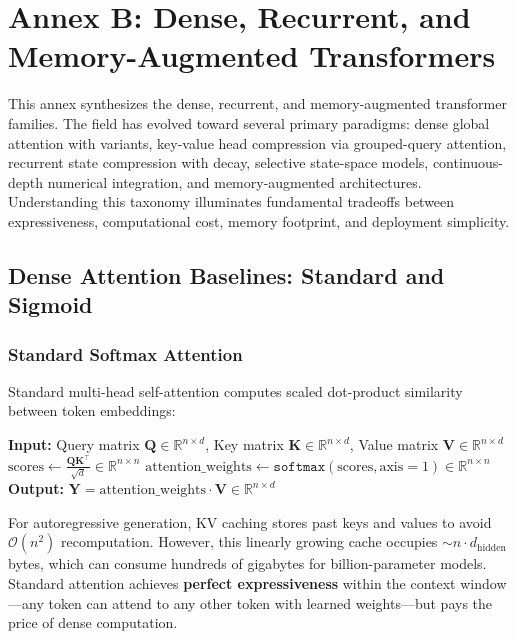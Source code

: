 \section{Annex B: Dense, Recurrent, and Memory-Augmented Transformers}
\label{sec:annex-transformer}

This annex synthesizes the dense, recurrent, and memory-augmented transformer families. The field has evolved toward several primary paradigms: dense global attention with variants, key-value head compression via grouped-query attention, recurrent state compression with decay, selective state-space models, continuous-depth numerical integration, and memory-augmented architectures. Understanding this taxonomy illuminates fundamental tradeoffs between expressiveness, computational cost, memory footprint, and deployment simplicity.

\subsection{Dense Attention Baselines: Standard and Sigmoid}

\subsubsection{Standard Softmax Attention}
Standard multi-head self-attention \citep{vaswani_attention_2017} computes scaled dot-product similarity between token embeddings:

\begin{algorithmic}[1]
\State \textbf{Input:} Query matrix $\mathbf{Q} \in \mathbb{R}^{n \times d}$, Key matrix $\mathbf{K} \in \mathbb{R}^{n \times d}$, Value matrix $\mathbf{V} \in \mathbb{R}^{n \times d}$
\State $\text{scores} \gets \frac{\mathbf{Q}\mathbf{K}^\top}{\sqrt{d}} \in \mathbb{R}^{n \times n}$ 
\State $\text{attention\_weights} \gets \texttt{softmax}(\text{scores}, \text{axis}=1) \in \mathbb{R}^{n \times n}$ 
\State \textbf{Output:} $\mathbf{Y} = \text{attention\_weights} \cdot \mathbf{V} \in \mathbb{R}^{n \times d}$ 
\end{algorithmic}

For autoregressive generation, KV caching stores past keys and values to avoid $\mathcal{O}(n^2)$ recomputation. However, this linearly growing cache occupies $\sim n \cdot d_{\text{hidden}}$ bytes, which can consume hundreds of gigabytes for billion-parameter models. Standard attention achieves \textbf{perfect expressiveness} within the context window---any token can attend to any other token with learned weights---but pays the price of dense computation.

